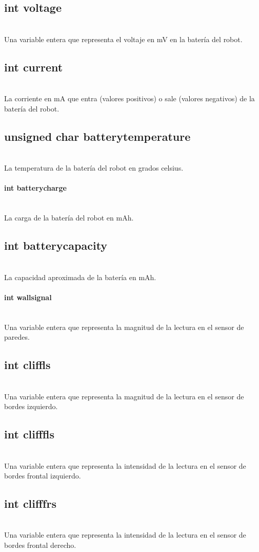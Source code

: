 \documentclass[letterpaper]{book}
\begin{document}
\subsection{int voltage}\mbox{}\\
Una variable entera que representa el voltaje en mV en la batería del robot.
\subsection{int current}\mbox{}\\
La corriente en mA que entra (valores positivos) o sale (valores negativos) de la batería del robot. 
\subsection{unsigned char batterytemperature}\mbox{}\\
La temperatura de la batería del robot en grados celsius.
\paragraph{int batterycharge}\mbox{}\\
La carga de la batería del robot en mAh.
\subsection{int batterycapacity}\mbox{}\\
La capacidad aproximada de la batería en mAh.
\paragraph{int wallsignal}\mbox{}\\
Una variable entera que representa la magnitud de la lectura en el sensor de paredes.
\subsection{int cliffls}\mbox{}\\
Una variable entera que representa la magnitud de la lectura en el sensor de bordes  izquierdo.
\subsection{int clifffls}\mbox{}\\
Una variable entera que representa la intensidad de la lectura en el sensor de bordes frontal izquierdo.
\subsection{int clifffrs}\mbox{}\\
Una variable entera que representa la intensidad de la lectura en el sensor de bordes frontal derecho.
\end{document}
